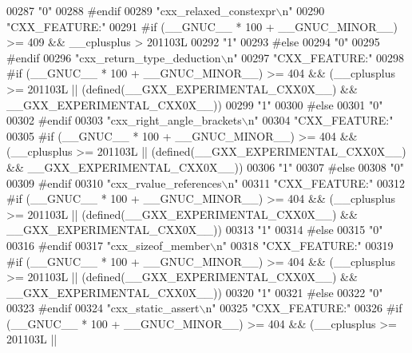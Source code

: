 \begin{DoxyCode}
00287 \textcolor{stringliteral}{"0"}
00288 \textcolor{preprocessor}{#endif}
00289 \textcolor{stringliteral}{"cxx\_relaxed\_constexpr\(\backslash\)n"}
00290 \textcolor{stringliteral}{"CXX\_FEATURE:"}
00291 \textcolor{preprocessor}{#if (\_\_GNUC\_\_ * 100 + \_\_GNUC\_MINOR\_\_) >= 409 && \_\_cplusplus > 201103L}
00292 \textcolor{stringliteral}{"1"}
00293 \textcolor{preprocessor}{#else}
00294 \textcolor{stringliteral}{"0"}
00295 \textcolor{preprocessor}{#endif}
00296 \textcolor{stringliteral}{"cxx\_return\_type\_deduction\(\backslash\)n"}
00297 \textcolor{stringliteral}{"CXX\_FEATURE:"}
00298 \textcolor{preprocessor}{#if (\_\_GNUC\_\_ * 100 + \_\_GNUC\_MINOR\_\_) >= 404 && (\_\_cplusplus >= 201103L ||
       (defined(\_\_GXX\_EXPERIMENTAL\_CXX0X\_\_) && \_\_GXX\_EXPERIMENTAL\_CXX0X\_\_))}
00299 \textcolor{stringliteral}{"1"}
00300 \textcolor{preprocessor}{#else}
00301 \textcolor{stringliteral}{"0"}
00302 \textcolor{preprocessor}{#endif}
00303 \textcolor{stringliteral}{"cxx\_right\_angle\_brackets\(\backslash\)n"}
00304 \textcolor{stringliteral}{"CXX\_FEATURE:"}
00305 \textcolor{preprocessor}{#if (\_\_GNUC\_\_ * 100 + \_\_GNUC\_MINOR\_\_) >= 404 && (\_\_cplusplus >= 201103L ||
       (defined(\_\_GXX\_EXPERIMENTAL\_CXX0X\_\_) && \_\_GXX\_EXPERIMENTAL\_CXX0X\_\_))}
00306 \textcolor{stringliteral}{"1"}
00307 \textcolor{preprocessor}{#else}
00308 \textcolor{stringliteral}{"0"}
00309 \textcolor{preprocessor}{#endif}
00310 \textcolor{stringliteral}{"cxx\_rvalue\_references\(\backslash\)n"}
00311 \textcolor{stringliteral}{"CXX\_FEATURE:"}
00312 \textcolor{preprocessor}{#if (\_\_GNUC\_\_ * 100 + \_\_GNUC\_MINOR\_\_) >= 404 && (\_\_cplusplus >= 201103L ||
       (defined(\_\_GXX\_EXPERIMENTAL\_CXX0X\_\_) && \_\_GXX\_EXPERIMENTAL\_CXX0X\_\_))}
00313 \textcolor{stringliteral}{"1"}
00314 \textcolor{preprocessor}{#else}
00315 \textcolor{stringliteral}{"0"}
00316 \textcolor{preprocessor}{#endif}
00317 \textcolor{stringliteral}{"cxx\_sizeof\_member\(\backslash\)n"}
00318 \textcolor{stringliteral}{"CXX\_FEATURE:"}
00319 \textcolor{preprocessor}{#if (\_\_GNUC\_\_ * 100 + \_\_GNUC\_MINOR\_\_) >= 404 && (\_\_cplusplus >= 201103L ||
       (defined(\_\_GXX\_EXPERIMENTAL\_CXX0X\_\_) && \_\_GXX\_EXPERIMENTAL\_CXX0X\_\_))}
00320 \textcolor{stringliteral}{"1"}
00321 \textcolor{preprocessor}{#else}
00322 \textcolor{stringliteral}{"0"}
00323 \textcolor{preprocessor}{#endif}
00324 \textcolor{stringliteral}{"cxx\_static\_assert\(\backslash\)n"}
00325 \textcolor{stringliteral}{"CXX\_FEATURE:"}
00326 \textcolor{preprocessor}{#if (\_\_GNUC\_\_ * 100 + \_\_GNUC\_MINOR\_\_) >= 404 && (\_\_cplusplus >= 201103L ||
}
\end{DoxyCode}
